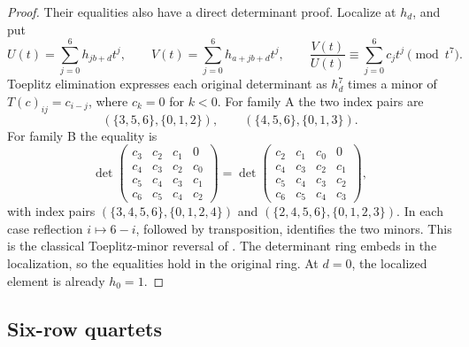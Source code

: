 \documentclass[11pt,a4paper]{amsart}
\numberwithin{equation}{section}
\theoremstyle{plain}
\theoremstyle{definition}
\begin{document}
\begin{proof}
Their equalities also have a direct determinant proof.  Localize at
\(h_d\), and put
\[
 U(t)=\sum_{j=0}^{6}h_{jb+d}t^j,\qquad
 V(t)=\sum_{j=0}^{6}h_{a+jb+d}t^j,\qquad
 \frac{V(t)}{U(t)}\equiv\sum_{j=0}^{6}c_jt^j\pmod{t^7}.
\]
Toeplitz elimination expresses each original determinant as \(h_d^7\)
times a minor of \(T(c)_{ij}=c_{i-j}\), where \(c_k=0\) for \(k<0\).
For family A the two index pairs are
\begin{equation}\label{eq:ten-family-a-minors}
 (\{3,5,6\},\{0,1,2\}),\qquad
 (\{4,5,6\},\{0,1,3\}).
\end{equation}
For family B the equality is
\begin{equation}\label{eq:ten-minor-equality}
 \det\begin{pmatrix}
 c_3&c_2&c_1&0\\c_4&c_3&c_2&c_0\\
 c_5&c_4&c_3&c_1\\c_6&c_5&c_4&c_2
 \end{pmatrix}
 =
 \det\begin{pmatrix}
 c_2&c_1&c_0&0\\c_4&c_3&c_2&c_1\\
 c_5&c_4&c_3&c_2\\c_6&c_5&c_4&c_3
 \end{pmatrix},
\end{equation}
with index pairs \((\{3,4,5,6\},\{0,1,2,4\})\) and
\((\{2,4,5,6\},\{0,1,2,3\})\).
In each case reflection \(i\mapsto6-i\), followed by transposition,
identifies the two minors.  This is the classical Toeplitz-minor reversal
of \cite{GarciaGarcia2020ToeplitzMinors}.
The determinant ring embeds in the localization, so the equalities hold
in the original ring.  At \(d=0\), the localized element is already
\(h_0=1\).
\end{proof}

\subsection{Six-row quartets}
\end{document}
